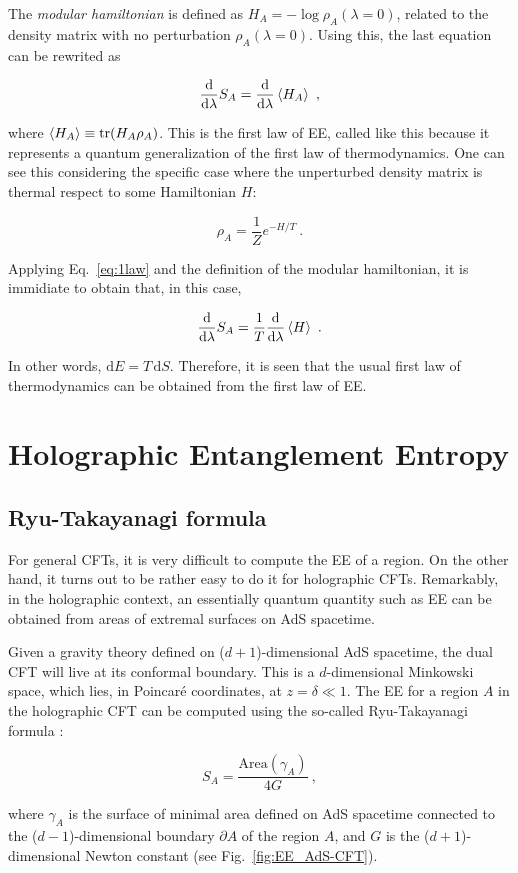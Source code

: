 \documentclass[twocolumn]{revtex4}
\providecommand{\eq}[2]{
    \begin{equation}
        #2
    \label{eq:#1}
    \end{equation}
}
\DeclareMathOperator{\tr}{tr}
\begin{document}
The \emph{modular hamiltonian} is defined as $H_A = - \log \rho_A (\lambda=0)$, related to the density matrix with no perturbation $\rho_A (\lambda=0)$. Using this, the last equation can be rewrited as
\eq{1law}{
    \frac{\mathrm{d}}{\mathrm{d} \lambda} S_A = \frac{\mathrm{d}}{\mathrm{d} \lambda} \braket{H_A} \ ,
}
where $\braket{H_A} \equiv \tr (H_A \rho_A)$. This is the first law of EE, called like this because it represents a quantum generalization of the first law of thermodynamics. One can see this considering the specific case where the unperturbed density matrix is thermal respect to some Hamiltonian $H$:
\eq{thermal_matrix}{
    \rho_A = \frac{1}{Z} e^{-H/T} \ .
}
Applying Eq.~\ref{eq:1law} and the definition of the modular hamiltonian, it is immidiate to obtain that, in this case,
\eq{1law_thermo}{
    \frac{\mathrm{d}}{\mathrm{d} \lambda} S_A = \frac{1}{T}\frac{\mathrm{d}}{\mathrm{d} \lambda} \braket{H} \ .
}
In other words, $\mathrm{d} E = T \, \mathrm{d} S$. Therefore, it is seen that the usual first law of thermodynamics can be obtained from the first law of EE.


\section{Holographic Entanglement Entropy} \label{s:EE_Holo}


\subsection{Ryu-Takayanagi formula} \label{ss:R-T}

For general CFTs, it is very difficult to compute the EE of a region. On the other hand, it turns out to be rather easy to do it for holographic CFTs. Remarkably, in the holographic context, an essentially quantum quantity such as EE can be obtained from areas of extremal surfaces on AdS spacetime.

Given a gravity theory defined on ($d+1$)-dimensional AdS spacetime, the dual CFT will live at its conformal boundary. This is a $d$-dimensional Minkowski space, which lies, in Poincar\'e coordinates, at 
$z=\delta \ll 1$. The EE for a region $A$ in the holographic CFT can be computed using the so-called Ryu-Takayanagi formula \cite{ryu_holographic_2008}:
\eq{EE_RT}{
    S_A = \frac{ \text{Area}(\gamma_A) }{ 4 G } \ ,
}
where $\gamma_A$ is the surface of minimal area defined on AdS spacetime connected to the ($d-1$)-dimensional boundary $\partial A$ of the region $A$, and $G$ is the ($d+1$)-dimensional Newton constant (see Fig.~\ref{fig:EE_AdS-CFT}).
\end{document}
